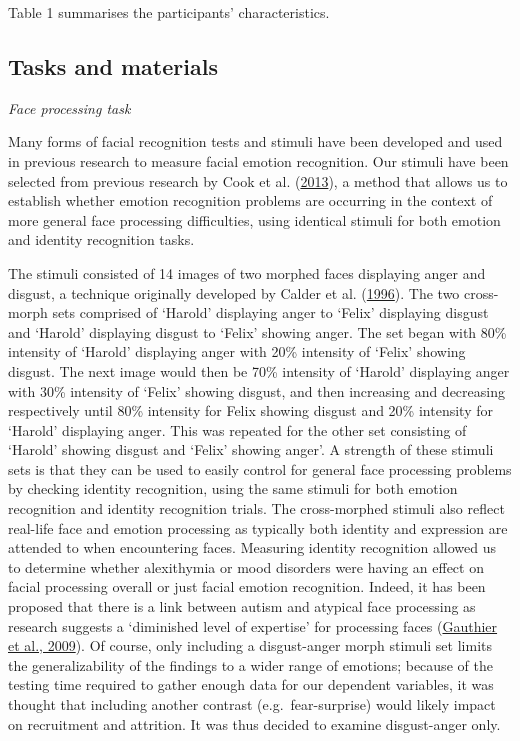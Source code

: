 \documentclass[
]{article}
\begin{document}
Table 1 summarises the participants' characteristics.

\hypertarget{tasks-and-materials}{%
\subsection*{Tasks and materials}\label{tasks-and-materials}}

\emph{Face processing task}

Many forms of facial recognition tests and stimuli have been developed and used in previous research to measure facial emotion recognition. Our stimuli have been selected from previous research by Cook et al. (\protect\hyperlink{ref-cook2013a}{2013}), a method that allows us to establish whether emotion recognition problems are occurring in the context of more general face processing difficulties, using identical stimuli for both emotion and identity recognition tasks.

The stimuli consisted of 14 images of two morphed faces displaying anger and disgust, a technique originally developed by Calder et al. (\protect\hyperlink{ref-calder1996a}{1996}). The two cross-morph sets comprised of `Harold' displaying anger to `Felix' displaying disgust and `Harold' displaying disgust to `Felix' showing anger. The set began with 80\% intensity of `Harold' displaying anger with 20\% intensity of `Felix' showing disgust. The next image would then be 70\% intensity of `Harold' displaying anger with 30\% intensity of `Felix' showing disgust, and then increasing and decreasing respectively until 80\% intensity for Felix showing disgust and 20\% intensity for `Harold' displaying anger. This was repeated for the other set consisting of `Harold' showing disgust and `Felix' showing anger'. A strength of these stimuli sets is that they can be used to easily control for general face processing problems by checking identity recognition, using the same stimuli for both emotion recognition and identity recognition trials. The cross-morphed stimuli also reflect real-life face and emotion processing as typically both identity and expression are attended to when encountering faces. Measuring identity recognition allowed us to determine whether alexithymia or mood disorders were having an effect on facial processing overall or just facial emotion recognition. Indeed, it has been proposed that there is a link between autism and atypical face processing as research suggests a `diminished level of expertise' for processing faces (\protect\hyperlink{ref-gauthier2009a}{Gauthier et al., 2009}). Of course, only including a disgust-anger morph stimuli set limits the generalizability of the findings to a wider range of emotions; because of the testing time required to gather enough data for our dependent variables, it was thought that including another contrast (e.g.~fear-surprise) would likely impact on recruitment and attrition. It was thus decided to examine disgust-anger only.
\end{document}
